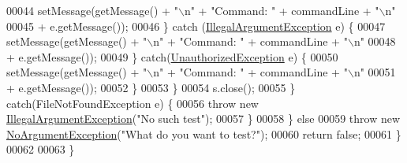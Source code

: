 \begin{DoxyCode}
00044                         setMessage(getMessage() + \textcolor{stringliteral}{"\(\backslash\)n"} + \textcolor{stringliteral}{"Command: "} + commandLine + \textcolor{stringliteral}{"\(\backslash\)n"}
00045                                 + e.getMessage());
00046                     \} \textcolor{keywordflow}{catch} (\hyperlink{classIllegalArgumentException}{IllegalArgumentException} e) \{
00047                         setMessage(getMessage() + \textcolor{stringliteral}{"\(\backslash\)n"} + \textcolor{stringliteral}{"Command: "} + commandLine + \textcolor{stringliteral}{"\(\backslash\)n"}
00048                                 + e.getMessage());
00049                     \} \textcolor{keywordflow}{catch}(\hyperlink{classUnauthorizedException}{UnauthorizedException} e)  \{
00050                         setMessage(getMessage() + \textcolor{stringliteral}{"\(\backslash\)n"} + \textcolor{stringliteral}{"Command: "} + commandLine + \textcolor{stringliteral}{"\(\backslash\)n"}
00051                                 + e.getMessage());
00052                     \}
00053                 \}
00054                 s.close();
00055             \} \textcolor{keywordflow}{catch}(FileNotFoundException e) \{
00056                 \textcolor{keywordflow}{throw} \textcolor{keyword}{new} \hyperlink{classIllegalArgumentException}{IllegalArgumentException}(\textcolor{stringliteral}{"No such test"});
00057             \}
00058         \} \textcolor{keywordflow}{else}
00059             \textcolor{keywordflow}{throw} \textcolor{keyword}{new} \hyperlink{classNoArgumentException}{NoArgumentException}(\textcolor{stringliteral}{"What do you want to test?"});
00060         \textcolor{keywordflow}{return} \textcolor{keyword}{false};
00061     \}
00062 
00063 \}
\end{DoxyCode}
